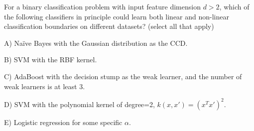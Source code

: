 For a binary classification problem with input feature dimension \(d>2\), which of the following classifiers in principle could learn both linear and non-linear classification boundaries on different datasets? (select all that apply)


A) Naïve Bayes with the Gaussian distribution as the CCD.


B) SVM with the RBF kernel.


C) AdaBoost with the decision stump as the weak learner, and the number of weak learners is at least 3.


D) SVM with the polynomial kernel of degree=2, \(k(x,x')=(x^Tx')^2\).


E) Logistic regression for some specific \(\alpha\).
